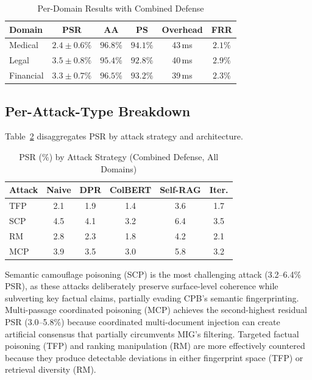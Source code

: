 \documentclass[journal,10pt]{IEEEtran}
\begin{document}
\begin{table}[t]
\centering
\caption{Per-Domain Results with Combined Defense}
\label{tab:domain_results}
\renewcommand{\arraystretch}{1.1}
\scriptsize
\begin{tabular}{@{}l c c c c c@{}}
\toprule
\textbf{Domain} & \textbf{PSR} & \textbf{AA} & \textbf{PS} & \textbf{Overhead} & \textbf{FRR} \\
\midrule
Medical & $2.4 \pm 0.6\%$ & $96.8\%$ & $94.1\%$ & 43\,ms & $2.1\%$ \\
Legal & $3.5 \pm 0.8\%$ & $95.4\%$ & $92.8\%$ & 40\,ms & $2.9\%$ \\
Financial & $3.3 \pm 0.7\%$ & $96.5\%$ & $93.2\%$ & 39\,ms & $2.3\%$ \\
\bottomrule
\end{tabular}
\end{table}

\subsection{Per-Attack-Type Breakdown}

Table~\ref{tab:attack_results} disaggregates PSR by attack strategy and architecture.

\begin{table}[t]
\centering
\caption{PSR (\%) by Attack Strategy (Combined Defense, All Domains)}
\label{tab:attack_results}
\renewcommand{\arraystretch}{1.1}
\scriptsize
\begin{tabular}{@{}l c c c c c@{}}
\toprule
\textbf{Attack} & \textbf{Naive} & \textbf{DPR} & \textbf{ColBERT} & \textbf{Self-RAG} & \textbf{Iter.} \\
\midrule
TFP & 2.1 & 1.9 & 1.4 & 3.6 & 1.7 \\
SCP & 4.5 & 4.1 & 3.2 & 6.4 & 3.5 \\
RM & 2.8 & 2.3 & 1.8 & 4.2 & 2.1 \\
MCP & 3.9 & 3.5 & 3.0 & 5.8 & 3.2 \\
\bottomrule
\end{tabular}
\end{table}

Semantic camouflage poisoning (SCP) is the most challenging attack (3.2--6.4\% PSR), as these attacks deliberately preserve surface-level coherence while subverting key factual claims, partially evading CPB's semantic fingerprinting. Multi-passage coordinated poisoning (MCP) achieves the second-highest residual PSR (3.0--5.8\%) because coordinated multi-document injection can create artificial consensus that partially circumvents MIG's filtering. Targeted factual poisoning (TFP) and ranking manipulation (RM) are more effectively countered because they produce detectable deviations in either fingerprint space (TFP) or retrieval diversity (RM).
\end{document}
